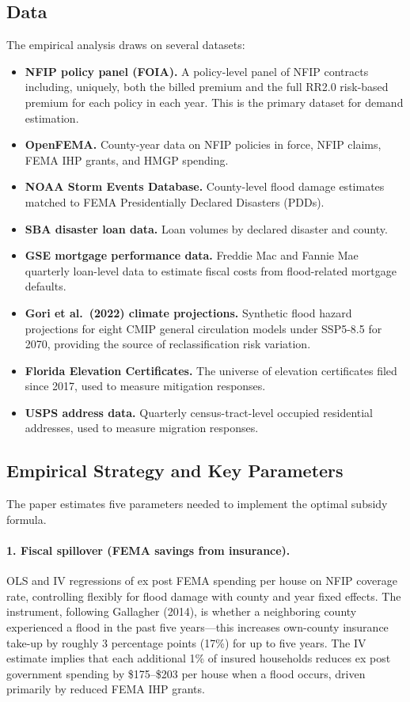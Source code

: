 \documentclass[12pt]{article}
\begin{document}
\subsection{Data}

The empirical analysis draws on several datasets:

\begin{itemize}
    \item \textbf{NFIP policy panel (FOIA).} A policy-level panel of NFIP contracts including, uniquely, both the billed premium and the full RR2.0 risk-based premium for each policy in each year. This is the primary dataset for demand estimation.
    \item \textbf{OpenFEMA.} County-year data on NFIP policies in force, NFIP claims, FEMA IHP grants, and HMGP spending.
    \item \textbf{NOAA Storm Events Database.} County-level flood damage estimates matched to FEMA Presidentially Declared Disasters (PDDs).
    \item \textbf{SBA disaster loan data.} Loan volumes by declared disaster and county.
    \item \textbf{GSE mortgage performance data.} Freddie Mac and Fannie Mae quarterly loan-level data to estimate fiscal costs from flood-related mortgage defaults.
    \item \textbf{Gori et al.\ (2022) climate projections.} Synthetic flood hazard projections for eight CMIP general circulation models under SSP5-8.5 for 2070, providing the source of reclassification risk variation.
    \item \textbf{Florida Elevation Certificates.} The universe of elevation certificates filed since 2017, used to measure mitigation responses.
    \item \textbf{USPS address data.} Quarterly census-tract-level occupied residential addresses, used to measure migration responses.
\end{itemize}

\subsection{Empirical Strategy and Key Parameters}

The paper estimates five parameters needed to implement the optimal subsidy formula.

\paragraph{1. Fiscal spillover (FEMA savings from insurance).}
OLS and IV regressions of ex post FEMA spending per house on NFIP coverage rate, controlling flexibly for flood damage with county and year fixed effects. The instrument, following Gallagher (2014), is whether a neighboring county experienced a flood in the past five years---this increases own-county insurance take-up by roughly 3 percentage points (17\%) for up to five years. The IV estimate implies that each additional 1\% of insured households reduces ex post government spending by \$175--\$203 per house when a flood occurs, driven primarily by reduced FEMA IHP grants.
\end{document}
